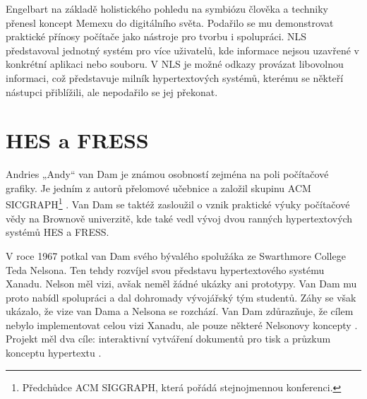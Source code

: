 Engelbart na základě holistického pohledu na symbiózu člověka a techniky přenesl koncept Memexu do digitálního světa. Podařilo se mu demonstrovat praktické přínosy počítače jako nástroje pro tvorbu i spolupráci. NLS představoval jednotný systém pro více uživatelů, kde informace nejsou uzavřené v konkrétní aplikaci nebo souboru. V NLS je možné odkazy provázat libovolnou informaci, což představuje milník hypertextových systémů, kterému se někteří nástupci přiblížili, ale nepodařilo se jej překonat.

\section{HES a FRESS}
\label{sec:hes}

Andries „Andy“ van Dam je známou osobností zejména na poli počítačové grafiky. Je jedním z autorů přelomové učebnice  a založil skupinu ACM SICGRAPH\footnote{Předchůdce ACM SIGGRAPH, která pořádá stejnojmennou konferenci.} \autocite[91]{Barnet2014}.
Van Dam se taktéž zasloužil o vznik praktické výuky počítačové vědy na Brownově univerzitě, kde také vedl vývoj dvou ranných hypertextových systémů HES a FRESS.

V roce 1967 potkal van Dam svého bývalého spolužáka ze Swarthmore College Teda Nelsona. Ten tehdy rozvíjel svou představu hypertextového systému Xanadu. Nelson měl vizi, avšak neměl žádné ukázky ani prototypy. Van Dam mu proto nabídl spolupráci a dal dohromady vývojářský tým studentů. Záhy se však ukázalo, že vize van Dama a Nelsona se rozchází. Van Dam zdůrazňuje, že cílem nebylo implementovat celou vizi Xanadu, ale pouze některé Nelsonovy koncepty \autocite[99--101]{Barnet2014}. Projekt měl dva cíle: interaktivní vytváření dokumentů pro tisk a průzkum konceptu hypertextu \autocite[889]{vanDam1988}.

